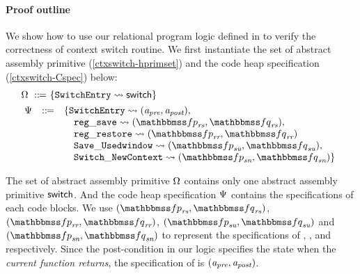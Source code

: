 {\color{blue}
\paragraph{\textbf{Proof outline}} We show how to use 
our relational program logic defined in 
\Fig{\ref{fig:Selected Inference Rules for Refinement Verification}} 
to verify the correctness of context switch routine. 
We first instantiate the set of 
abstract assembly primitive (\ref{ctxswitch-hprimset})
and the code heap specification (\ref{ctxswitch-Cspec})
below:
\begin{align}
    & \hprimset \ \define \ \{ \SwitchEntry \leadsto 
        \primsw \} 
        \label{ctxswitch-hprimset} \\
    & \!\begin{array}{lcl}
        \Cspec & \define & 
        \{ \SwitchEntry \leadsto (\Apre, \Apost), \\
        & & \quad
        \regsave \leadsto 
        (\relspecpre_{\textit{rs}}, \relspecpost_{\textit{rs}}),\\
        & & \quad
        \regrestore \leadsto
        (\relspecpre_{\textit{rr}}, \relspecpost_{\textit{rr}}) \\
        & & \quad
        \SaveUsedWin{} \leadsto (\relspecpre_{\textit{su}}, \relspecpost_{\textit{su}}), \\
        & & \quad
        \SwitchNewTask{} \leadsto (\relspecpre_{\textit{sn}}, \relspecpost_{\textit{sn}})
        \}
        \label{ctxswitch-Cspec}
    \end{array}
\end{align}

The set of abstract assembly primitive $\Omega$ 
contains only one abstract assembly primitive $\mathsf{switch}$. 
And the code heap specification $\Psi{}$
contains the specifications of each code blocks. 
We use 
$(\relspecpre_{\textit{rs}}, \relspecpost_{\textit{rs}})$, 
$(\relspecpre_{\textit{rr}}, \relspecpost_{\textit{rr}})$, 
$(\relspecpre_{\textit{su}}, \relspecpost_{\textit{su}})$ and
$(\relspecpre_{\textit{sn}}, \relspecpost_{\textit{sn}})$
to represent the specifications of 
\regsave{}, \regrestore{}, 
\SaveUsedWin{} and \SwitchNewTask{} respectively. 
Since the post-condition in our logic specifies the 
state when the \textit{current function returns}, 
the specification of \SwitchEntry{} is $(\textit{a}_\textit{pre}, \textit{a}_\textit{post})$.

}
